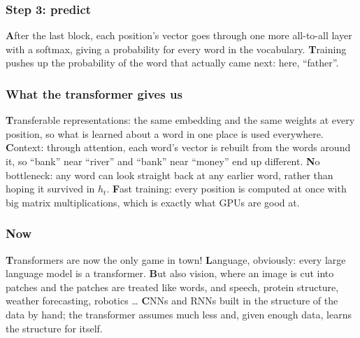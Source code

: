 \documentclass{beamer}
\begin{document}
\begin{frame}
  \frametitle{Step 3: predict}
\vskip 0.1cm
\begin{center}
\end{center}
\vskip 0.1cm
\textbf{A}fter the last block, each position's vector goes through one more all-to-all layer with a softmax, giving a probability for every word in the vocabulary.
\vskip 0.1cm
\textbf{T}raining pushes up the probability of the word that actually came next: here, ``father''.
\end{frame}

\begin{frame}
  \frametitle{What the transformer gives us}
\vskip 0.25cm
\textbf{T}ransferable representations: the same embedding and the same weights at every position, so what is learned about a word in one place is used everywhere.
\vskip 0.2cm
\textbf{C}ontext: through attention, each word's vector is rebuilt from the words around it, so ``bank'' near ``river'' and ``bank'' near ``money'' end up different.
\vskip 0.2cm
\textbf{N}o bottleneck: any word can look straight back at any earlier word, rather than hoping it survived in $h_t$.
\vskip 0.2cm
\textbf{F}ast training: every position is computed at once with big matrix multiplications, which is exactly what GPUs are good at.
\end{frame}

\begin{frame}
  \frametitle{Now}
\vskip 0.25cm
\textbf{T}ransformers are now the only game in town!
\vskip 0.2cm
\textbf{L}anguage, obviously: every large language model is a transformer.
\vskip 0.2cm
\textbf{B}ut also vision, where an image is cut into patches and the patches are treated like words, and speech, protein structure, weather forecasting, robotics \dots
\vskip 0.2cm
\textbf{C}NNs and RNNs built in the structure of the data by hand; the transformer assumes much less and, given enough data, learns the structure for itself.
\end{frame}
\end{document}
